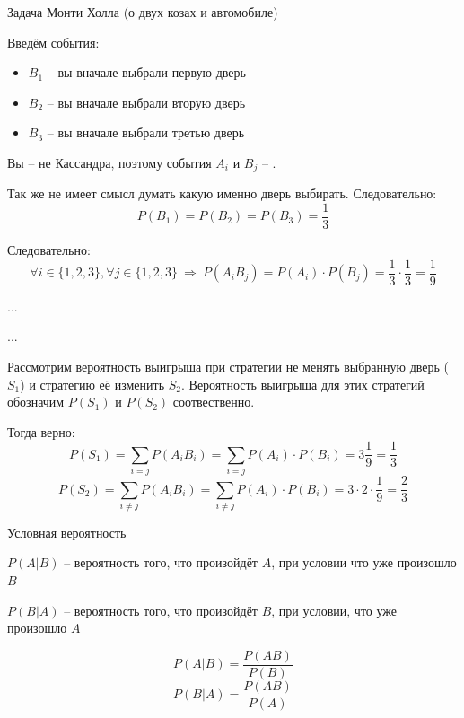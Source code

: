 \begin{frame}{Задача Монти Холла (о двух козах и автомобиле)}

Введём события:
\begin{itemize}
	\item $B_1$ -- вы вначале выбрали первую дверь
	\item $B_2$ -- вы вначале выбрали вторую дверь
	\item $B_3$ -- вы вначале выбрали третью дверь
\end{itemize}

Вы -- не Кассандра, поэтому события $A_i$ и $B_j$ -- .


Так же не имеет смысл думать какую именно дверь выбирать.
Следовательно:
\begin{equation}\label{eq:B_pofig}
P(B_1) = P(B_2) = P(B_3) = \frac{1}{3}
\end{equation}

Следовательно:
\begin{equation*}
\forall i \in \{1,2,3\}, \forall j \in \{1,2,3\} ~\Longrightarrow~ P(A_i B_j) = P(A_i) \cdot P(B_j) = \frac{1}{3} \cdot \frac{1}{3}=\frac{1}{9}
\end{equation*}

...
\end{frame}
\begin{frame}
...

Рассмотрим вероятность выигрыша при стратегии не менять выбранную дверь ($S_1$) и стратегию её изменить $S_2$.
Вероятность выигрыша для этих стратегий обозначим $P(S_1)$ и $P(S_2)$ соотвественно.

Тогда верно:
\begin{equation}
P(S_1) =  \sum_{i=j} P(A_i B_i) = \sum_{i=j} P(A_i)\cdot P(B_i) = 3 \frac{1}{9} = \frac{1}{3}
\end{equation}
\begin{equation}
P(S_2) =  \sum_{i \neq j} P(A_i B_i) = \sum_{i \neq j} P(A_i)\cdot P(B_i) = 3 \cdot 2 \cdot \frac{1}{9} = \frac{2}{3}
\end{equation}

	
\end{frame}


\begin{frame}{Условная вероятность}

$P(A|B)$ -- вероятность того, что произойдёт $A$, при условии что уже произошло $B$

$P(B|A)$ -- вероятность того, что произойдёт $B$, при условии, что уже произошло $A$

\begin{equation}\label{eq:P_A_by_B}
P(A|B) = \frac{P(AB)}{P(B)}
\end{equation}
\begin{equation}\label{eq:P_B_by_A}
P(B|A) = \frac{P(AB)}{P(A)}
\end{equation}

	
\end{frame}

